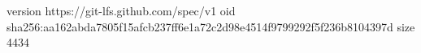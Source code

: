 version https://git-lfs.github.com/spec/v1
oid sha256:aa162abda7805f15afcb237ff6e1a72c2d98e4514f9799292f5f236b8104397d
size 4434
